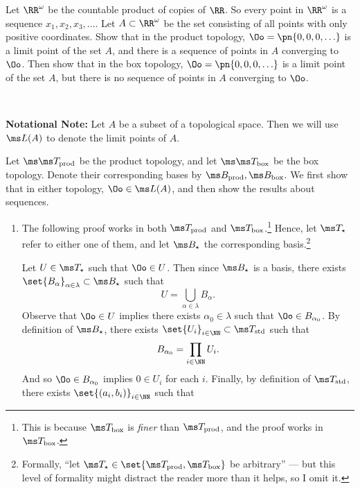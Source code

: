 \documentclass{fkpset}
\newcommand{\tprod}{\ensuremath \ms T_{\rm prod}}
\newcommand{\bprod}{\ensuremath \ms B_{\rm prod}}
\newcommand{\tbox}{\ensuremath \ms T_{\rm box}}
\newcommand{\bbox}{\ensuremath \ms B_{\rm box}}
\newcommand{\tstar}{\ensuremath \ms T_{\star}}
\newcommand{\bstar}{\ensuremath \ms B_{\star}}
\newenvironment{why}{\begin{adjustwidth}{0.01\linewidth}{0.05\linewidth}~}%
  {\end{adjustwidth}}
\begin{document}
  \begin{problem}[4.41]
    Let $\RR^\omega$ be the countable product of copies of $\RR$. So
    every point in $\RR^\omega$ is a sequence $x_1, x_2, x_3, \ldots$.
    Let $A \subset \RR^\omega$ be the set consisting of all points
    with only positive coordinates. Show that in the product topology,
    $\Oo = \pn{0,0,0,\ldots}$ is a limit point of the set $A$, and
    there is a sequence of points in $A$ converging to $\Oo$. Then
    show that in the box topology, $\Oo = \pn{0,0,0,\ldots}$ is a
    limit point of the set $A$, but there is no sequence of points in
    $A$ converging to $\Oo$.
  \end{problem}
  \begin{why}
    \begin{leftbar}
      \textbf{Notational Note:} Let $A$ be a subset of a topological
      space. Then we will use $\ms L(A)$ to denote the limit points of
      $A$.
    \end{leftbar}
  \end{why}
  \begin{solution}
    Let $\ms \tprod$ be the product topology, and let $\ms \tbox$ be
    the box topology. Denote their corresponding bases by $\bprod,
    \bbox$. We first show that in either topology, $\Oo \in \ms L(A)$,
    and then show the results about sequences.
    \begin{enumerate}[label=(\arabic*)]
      \item The following proof works in both $\tprod$ and
        $\tbox$.\footnote{This is because $\tbox$ is \emph{finer} than
          $\tprod$, and the proof works in $\tbox$.} Hence, let
        $\tstar$ refer to either one of them, and let $\bstar$ the
        corresponding basis.\footnote{Formally, ``let $\tstar \in
          \set{\tprod, \tbox}$ be arbitrary'' --- but this level of
          formality might distract the reader more than it helps, so I
          omit it.}

        Let $U \in \tstar$ such that $\Oo \in U$. Then since $\bstar$
        is a basis, there exists $\set{B_\alpha}_{\alpha \in \lambda}
        \subset \bstar$ such that
        \[
          U = \bigcup_{\alpha \in \lambda} B_\alpha.
        \]
        Observe that $\Oo \in U$ implies there exists $\alpha_0 \in
        \lambda$ such that $\Oo \in B_{\alpha_0}$. By definition of
        $\ms B_\star$, there exists $\set{U_i}_{i \in \NN} \subset \ms
        T_{\rm std}$ such that
        \[
          B_{\alpha_0} = \prod_{i \in \NN} U_i.
        \]
        And so $\Oo \in B_{\alpha_0}$ implies $0 \in U_i$ for each
        $i$. Finally, by definition of $\ms T_{\rm std}$, there exists
        $\set{(a_i, b_i)}_{i \in \NN}$ such that
    \end{enumerate}
  \end{solution}
  \clearpage
\end{document}
